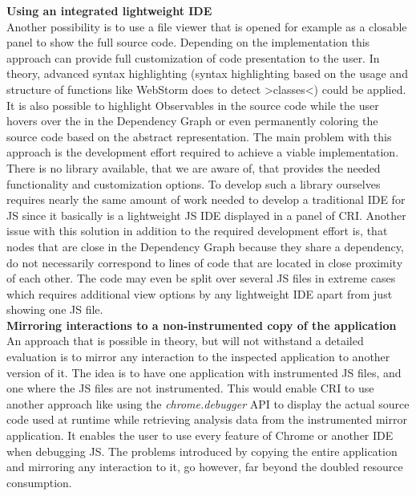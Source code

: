 \textbf{Using an integrated lightweight IDE}\\
Another possibility is to use a file viewer that is opened for example as a closable panel to show the full source code. Depending on the implementation this approach can provide full customization of code presentation to the user. In theory, advanced syntax highlighting (syntax highlighting based on the usage and structure of functions like WebStorm does to detect >classes<) could be applied. It is also possible to highlight Observables in the source code while the user hovers over the in the Dependency Graph or even permanently coloring the source code based on the abstract representation. The main problem with this approach is the development effort required to achieve a viable implementation. There is no library available, that we are aware of, that provides the needed functionality and customization options. To develop such a library ourselves requires nearly the same amount of work needed to develop a traditional IDE for JS since it basically is a lightweight JS IDE displayed in a panel of CRI. Another issue with this solution in addition to the required development effort is, that nodes that are close in the Dependency Graph because they share a dependency, do not necessarily correspond to lines of code that are located in close proximity of each other. The code may even be split over several JS files in extreme cases which requires additional view options by any lightweight IDE apart from just showing one JS file.\\ %
\textbf{Mirroring interactions to a non-instrumented copy of the application}\\
An approach that is possible in theory, but will not withstand a detailed evaluation is to mirror any interaction to the inspected application to another version of it. The idea is to have one application with instrumented JS files, and one where the JS files are not instrumented. This would enable CRI to use another approach like using the \emph{chrome.debugger} API to display the actual source code used at runtime while retrieving analysis data from the instrumented mirror application. It enables the user to use every feature of Chrome or another IDE when debugging JS. The problems introduced by copying the entire application and mirroring any interaction to it, go however, far beyond the doubled resource consumption. %
